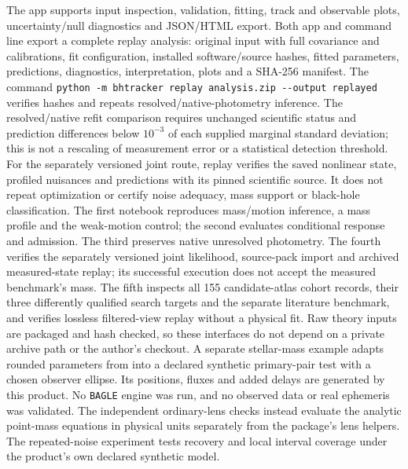 The app supports input inspection, validation, fitting, track and
observable plots, uncertainty/null diagnostics and JSON/HTML export.
Both app and command line export a complete replay analysis: original
input with full covariance and calibrations, fit configuration, installed
software/source hashes, fitted parameters, predictions, diagnostics,
interpretation, plots and a SHA-256 manifest. The command
\texttt{python -m bhtracker replay analysis.zip -{}-output replayed}
verifies hashes and repeats resolved/native-photometry inference. The
resolved/native refit comparison
requires unchanged scientific status and prediction differences below
$10^{-3}$ of each supplied marginal standard deviation; this is not a
rescaling of measurement error or a statistical detection threshold.
For the separately versioned joint route, replay verifies the saved
nonlinear state, profiled nuisances and predictions with its pinned
scientific source. It does not repeat optimization or certify noise
adequacy, mass support or black-hole classification.
The first notebook reproduces
mass/motion inference, a mass profile and the weak-motion control; the
second evaluates conditional response and admission. The third preserves
native unresolved photometry. The fourth verifies the separately versioned
joint likelihood, source-pack import and archived measured-state replay;
its successful execution does not accept the measured benchmark's mass.
The fifth inspects all 155 candidate-atlas cohort records, their three
differently qualified search targets and the separate literature benchmark,
and verifies lossless filtered-view replay without a physical fit.
Raw theory inputs
are packaged and hash checked, so these interfaces do not depend on a
private archive path or the author's checkout. A separate stellar-mass
example adapts rounded parameters from \citet{Lu2025} into a declared
synthetic primary-pair test with a chosen observer ellipse. Its positions,
fluxes and added delays are generated by this product. No \texttt{BAGLE}
engine was run, and no observed data or real ephemeris was validated.
The independent ordinary-lens checks instead evaluate the analytic
point-mass equations in physical units separately from the package's
lens helpers. The repeated-noise experiment tests recovery and local
interval coverage under the product's own declared synthetic model.
